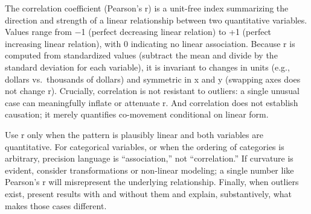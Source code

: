 \documentclass[
  letterpaper,
  DIV=11,
  numbers=noendperiod]{scrreprt}
\begin{document}
The correlation coefficient (Pearson's r) is a unit-free index
summarizing the direction and strength of a linear relationship between
two quantitative variables. Values range from −1 (perfect decreasing
linear relation) to +1 (perfect increasing linear relation), with 0
indicating no linear association. Because r is computed from
standardized values (subtract the mean and divide by the standard
deviation for each variable), it is invariant to changes in units (e.g.,
dollars vs.~thousands of dollars) and symmetric in x and y (swapping
axes does not change r). Crucially, correlation is not resistant to
outliers: a single unusual case can meaningfully inflate or attenuate r.
And correlation does not establish causation; it merely quantifies
co-movement conditional on linear form.

Use r only when the pattern is plausibly linear and both variables are
quantitative. For categorical variables, or when the ordering of
categories is arbitrary, precision language is ``association,'' not
``correlation.'' If curvature is evident, consider transformations or
non-linear modeling; a single number like Pearson's r will misrepresent
the underlying relationship. Finally, when outliers exist, present
results with and without them and explain, substantively, what makes
those cases different.
\end{document}
